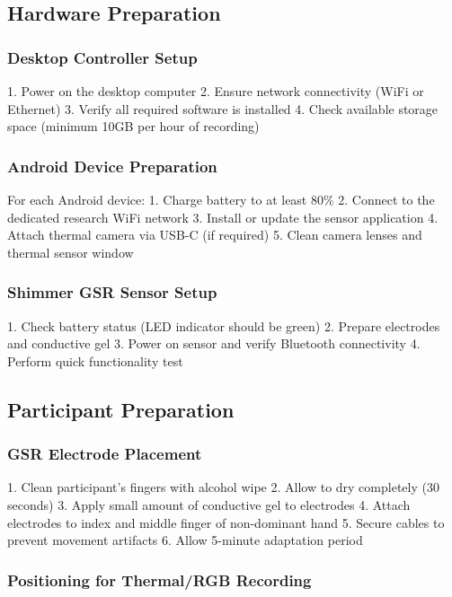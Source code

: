 \subsection{Hardware Preparation}

\subsubsection{Desktop Controller Setup}

1. Power on the desktop computer
2. Ensure network connectivity (WiFi or Ethernet)
3. Verify all required software is installed
4. Check available storage space (minimum 10GB per hour of recording)

\subsubsection{Android Device Preparation}

For each Android device:
1. Charge battery to at least 80\%
2. Connect to the dedicated research WiFi network
3. Install or update the sensor application
4. Attach thermal camera via USB-C (if required)
5. Clean camera lenses and thermal sensor window

\subsubsection{Shimmer GSR Sensor Setup}

1. Check battery status (LED indicator should be green)
2. Prepare electrodes and conductive gel
3. Power on sensor and verify Bluetooth connectivity
4. Perform quick functionality test

\subsection{Participant Preparation}

\subsubsection{GSR Electrode Placement}

1. Clean participant's fingers with alcohol wipe
2. Allow to dry completely (30 seconds)
3. Apply small amount of conductive gel to electrodes
4. Attach electrodes to index and middle finger of non-dominant hand
5. Secure cables to prevent movement artifacts
6. Allow 5-minute adaptation period

\subsubsection{Positioning for Thermal/RGB Recording}


